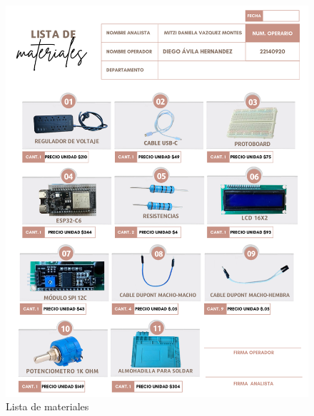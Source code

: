     \begin{figure}[H]
        \centering
        \includegraphics[trim = {1mm 1mm 1mm 1mm},clip,scale=0.2]{34/img/listaDeMateriales.png}
        \caption{Lista de materiales}
        \label{fig:enter-label1}
    \end{figure}
